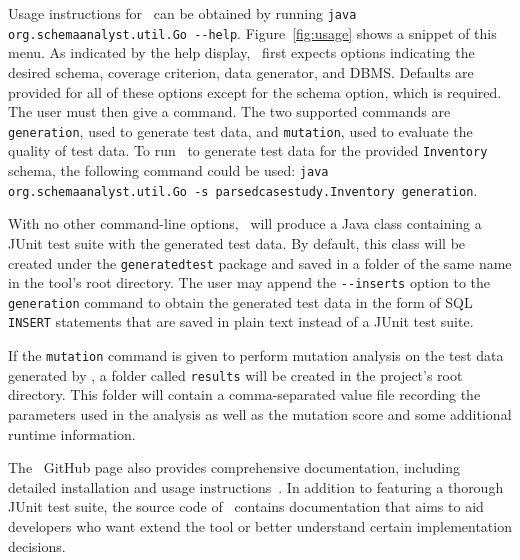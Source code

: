Usage instructions for \sa~can be obtained by running \lstinline{java org.schemaanalyst.util.Go --help}.
Figure~\ref{fig:usage} shows a snippet of this menu.  As indicated by the help display, \sa~first expects options
indicating the desired schema, coverage criterion, data generator, and DBMS\@. Defaults are provided for all of these
options except for the schema option, which is required. The user must then give a command.  The two supported commands
are \lstinline{generation}, used to generate test data, and \lstinline{mutation}, used to evaluate the quality of test
data.  To run \sa~to generate test data for the provided \texttt{Inventory} schema, the following command could be used:
\lstinline{java org.schemaanalyst.util.Go -s parsedcasestudy.Inventory generation}.


With no other command-line options, \sa~will produce a Java class containing a JUnit test suite with the generated test
data. By default, this class will be created under the \texttt{generatedtest} package and saved in a folder of the same
name in the tool's root directory.  The user may append the \lstinline{--inserts} option to the \lstinline{generation}
command to obtain the generated test data in the form of SQL \texttt{INSERT} statements that are saved in plain text
instead of a JUnit test suite.




If the \lstinline{mutation} command is given to perform mutation analysis on the test data generated by \sa, a folder
called \lstinline{results} will be created in the project's root directory. This folder will contain a comma-separated
value file recording the parameters used in the analysis as well as the mutation score and some additional runtime
information.


The \sa~GitHub page also provides comprehensive documentation, including detailed installation and usage
instructions~\cite{tool}. In addition to featuring a thorough JUnit test suite, the source code of \sa~contains
documentation that aims to aid developers who want extend the tool or better understand certain implementation
decisions.




